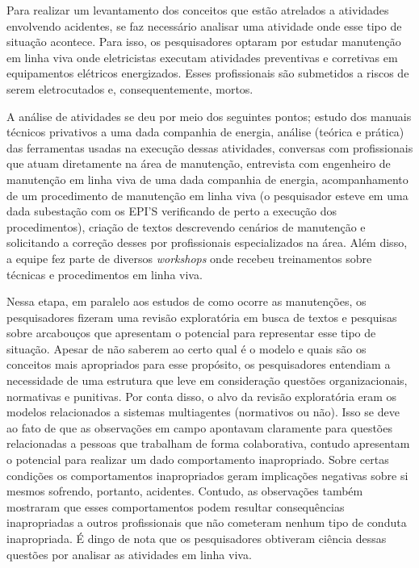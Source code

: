 Para realizar um levantamento dos conceitos que estão atrelados a atividades envolvendo acidentes, se faz necessário analisar uma atividade onde esse tipo de situação acontece. Para isso, os pesquisadores optaram por estudar manutenção em linha viva onde eletricistas executam atividades preventivas e corretivas em equipamentos elétricos energizados. Esses profissionais são submetidos a riscos de serem eletrocutados e, consequentemente, mortos. 

A análise de atividades se deu por meio dos seguintes pontos; estudo dos manuais técnicos privativos a uma dada companhia de energia, análise (teórica e prática) das ferramentas usadas na execução dessas atividades, conversas com profissionais que atuam diretamente na área de manutenção, entrevista com engenheiro de manutenção em linha viva de uma dada companhia de energia, acompanhamento de um procedimento de manutenção em linha viva (o pesquisador esteve em uma dada subestação com os EPI'S verificando de perto a execução dos procedimentos), criação de textos descrevendo cenários de manutenção e solicitando a correção desses por profissionais especializados na área. Além disso, a equipe fez parte de diversos \textit{workshops} onde recebeu treinamentos sobre técnicas e procedimentos em linha viva. 

Nessa etapa, em paralelo aos estudos de como ocorre as manutenções, os pesquisadores fizeram uma revisão exploratória em busca de textos e pesquisas sobre arcabouços que apresentam o potencial para representar esse tipo de situação. Apesar de não saberem ao certo qual é o modelo e quais são os conceitos mais apropriados para esse propósito, os pesquisadores entendiam a necessidade de uma estrutura que leve em consideração questões organizacionais, normativas e punitivas. Por conta disso, o alvo da revisão exploratória eram os modelos relacionados a sistemas multiagentes (normativos ou não). Isso se deve ao fato de que as observações em campo apontavam claramente para questões relacionadas a pessoas que trabalham de forma colaborativa, contudo apresentam o potencial para realizar um dado comportamento inapropriado. Sobre certas condições os comportamentos inapropriados geram implicações negativas sobre si mesmos sofrendo, portanto, acidentes. Contudo, as observações também mostraram que esses comportamentos podem resultar consequências inapropriadas a outros profissionais que não cometeram nenhum tipo de conduta inapropriada. É dingo de nota que os pesquisadores obtiveram ciência dessas questões por analisar as atividades em linha viva.